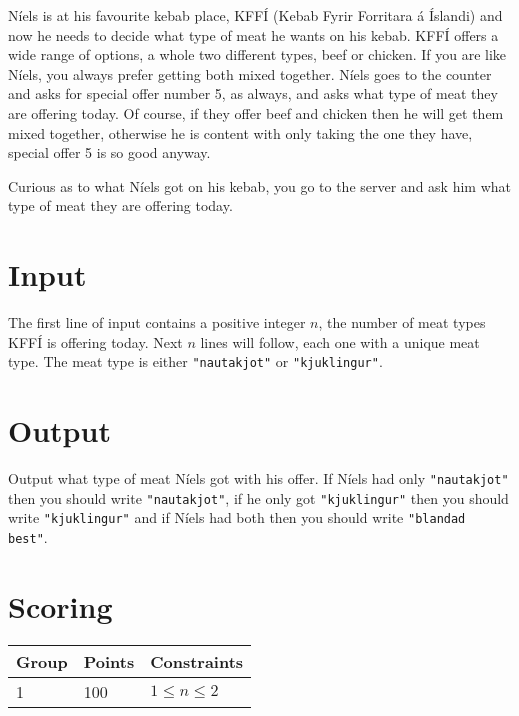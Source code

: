 
Níels is at his favourite kebab place, KFFÍ (Kebab Fyrir Forritara á Íslandi) and now he needs to decide what type of meat he wants on his kebab.
KFFÍ offers a wide range of options, a whole two different types, beef or chicken. If you are like Níels, you always prefer getting both mixed together.
Níels goes to the counter and asks for special offer number 5, as always, and asks what type of meat they are offering today.
Of course, if they offer beef and chicken then he will get them mixed together, otherwise he is content with only taking the one they have, special offer 5 is so good anyway.

Curious as to what Níels got on his kebab, you go to the server and ask him what type of meat they are offering today.

\section*{Input}
The first line of input contains a positive integer $n$, the number of meat types KFFÍ is offering today.
Next $n$ lines will follow, each one with a unique meat type. The meat type is either \texttt{"nautakjot"} or \texttt{"kjuklingur"}.

\section*{Output}
Output what type of meat Níels got with his offer.
If Níels had only \texttt{"nautakjot"} then you should write \texttt{"nautakjot"}, if he only got \texttt{"kjuklingur"} then you should write \texttt{"kjuklingur"} and if Níels had both then you should write \texttt{"blandad best"}.

\section*{Scoring}
\begin{tabular}{|l|l|l|}
\hline
Group & Points & Constraints \\ \hline
1     & 100   & $1 \leq n \leq 2$ \\ \hline
\end{tabular}

